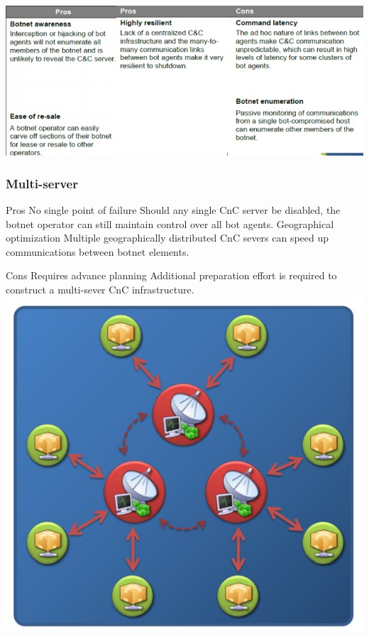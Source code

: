 \includegraphics[scale=1]{img/centralized_topo}

\subsubsection{Multi-server}
    Pros 
No single point of failure
Should any single CnC server be disabled, the botnet operator can still maintain control over all bot agents.
Geographical optimization
Multiple geographically distributed CnC severs can speed up communications between botnet elements.

    Cons
Requires advance planning
Additional preparation effort is required to construct a multi-sever CnC infrastructure.\\
\includegraphics[scale=1]{img/multi-server_topo.jpg}

